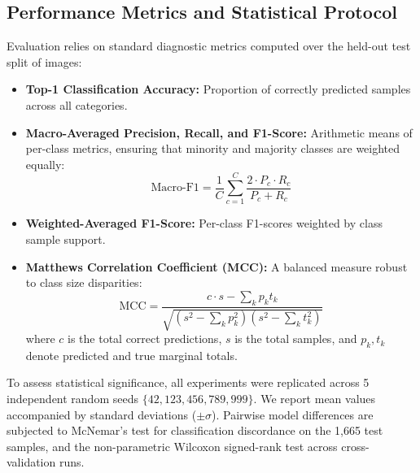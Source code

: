 \subsection{Performance Metrics and Statistical Protocol}
Evaluation relies on standard diagnostic metrics computed over the held-out test split of \testEvaluatedSamples{} images:
\begin{itemize}
    \item \textbf{Top-1 Classification Accuracy:} Proportion of correctly predicted samples across all categories.
    \item \textbf{Macro-Averaged Precision, Recall, and F1-Score:} Arithmetic means of per-class metrics, ensuring that minority and majority classes are weighted equally:
    \begin{equation}
        \text{Macro-F1} = \frac{1}{C} \sum_{c=1}^C \frac{2 \cdot P_c \cdot R_c}{P_c + R_c}
    \end{equation}
    \item \textbf{Weighted-Averaged F1-Score:} Per-class F1-scores weighted by class sample support.
    \item \textbf{Matthews Correlation Coefficient (MCC):} A balanced measure robust to class size disparities:
    \begin{equation}
        \text{MCC} = \frac{c \cdot s - \sum_k p_k t_k}{\sqrt{\left( s^2 - \sum_k p_k^2 \right) \left( s^2 - \sum_k t_k^2 \right)}}
    \end{equation}
    where $c$ is the total correct predictions, $s$ is the total samples, and $p_k, t_k$ denote predicted and true marginal totals.
\end{itemize}

To assess statistical significance, all experiments were replicated across 5 independent random seeds $\{42, 123, 456, 789, 999\}$. We report mean values accompanied by standard deviations ($\pm \sigma$). Pairwise model differences are subjected to McNemar's test for classification discordance on the 1,665 test samples, and the non-parametric Wilcoxon signed-rank test across cross-validation runs.

